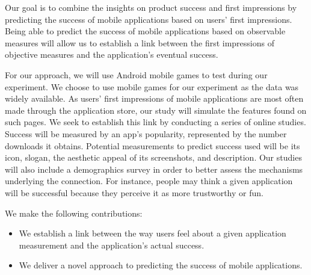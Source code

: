 Our goal is to combine the insights on product success and first impressions by predicting the success of mobile applications based on users' first impressions. Being able to predict the success of mobile applications  based on observable measures will allow us to establish a link between the first impressions of objective measures and the application’s eventual success.

For our approach, we will use Android mobile games to test during our experiment. We choose to use mobile games for our experiment as the data was widely available. As users' first impressions of mobile applications are most often made through the application store, our study will simulate the features found on such pages. We seek to establish this link by conducting a series of online studies. Success will be measured by an app's popularity, represented by the number downloads it obtains. Potential measurements to predict success used will be its icon, slogan, the aesthetic appeal of its screenshots, and description. Our studies will also include a demographics survey in order to better assess the mechanisms underlying the connection. For instance, people may think a given application will be successful because they perceive it as more trustworthy or fun.

We make the following contributions:
\begin{itemize}
\item We establish a link between the way users feel about a given application measurement and the application's actual success.
\item We deliver a novel approach to predicting the success of mobile applications.
\end{itemize}

